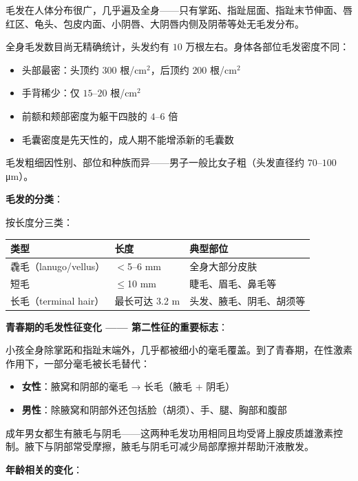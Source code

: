 毛发在人体分布很广，几乎遍及全身——只有掌跖、指趾屈面、指趾末节伸面、唇红区、龟头、包皮内面、小阴唇、大阴唇内侧及阴蒂等处无毛发分布。

全身毛发数目尚无精确统计，头发约有 $10$ 万根左右。身体各部位毛发密度不同：
\begin{itemize}
	\item 头部最密：头顶约 $300$ 根/cm$^2$，后顶约 $200$ 根/cm$^2$
	\item 手背稀少：仅 $15$--$20$ 根/cm$^2$
	\item 前额和颊部密度为躯干四肢的 $4$--$6$ 倍
	\item 毛囊密度是先天性的，成人期不能增添新的毛囊数
\end{itemize}

毛发粗细因性别、部位和种族而异——男子一般比女子粗（头发直径约 $70$--$100$ μm）。

\vspace{0.5em}
\noindent\textbf{毛发的分类}：

按长度分三类：
\begin{center}\small
\begin{tabular}{|l|l|p{6cm}|}
\hline
类型 & 长度 & 典型部位 \\
\hline
毳毛（lanugo/vellus） & $<$5--6 mm & 全身大部分皮肤 \\
短毛 & $\leq$10 mm & 睫毛、眉毛、鼻毛等 \\
长毛（terminal hair）& 最长可达 3.2 m & 头发、腋毛、阴毛、胡须等 \\
\hline
\end{tabular}
\end{center}

\vspace{0.5em}
\noindent\textbf{青春期的毛发性征变化 —— 第二性征的重要标志}：

小孩全身除掌跖和指趾末端外，几乎都被细小的毫毛覆盖。到了青春期，在性激素作用下，一部分毫毛被长毛替代：
\begin{itemize}
	\item \textbf{女性}：腋窝和阴部的毫毛 → 长毛（腋毛 + 阴毛）
	\item \textbf{男性}：除腋窝和阴部外还包括脸（胡须）、手、腿、胸部和腹部
\end{itemize}

成年男女都生有腋毛与阴毛——这两种毛发功用相同且均受肾上腺皮质雄激素控制。腋下与阴部常受摩擦，腋毛与阴毛可减少局部摩擦并帮助汗液散发。

\vspace{0.5em}
\noindent\textbf{年龄相关的变化}：

